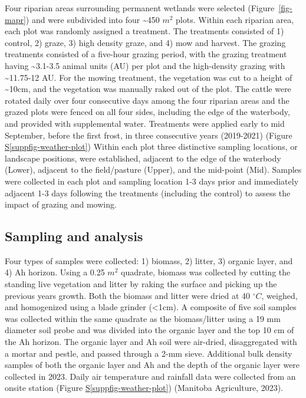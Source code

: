 \documentclass[
]{agujournal2019}
\newcommand*\quartosuppfigref[1]{Figure \hyperref[#1]{S\ref{#1}}}
\begin{document}
Four riparian areas surrounding permanent wetlands were selected
(Figure~\ref{fig-mapr}) and were subdivided into four \textasciitilde450
\(m^2\) plots. Within each riparian area, each plot was randomly
assigned a treatment. The treatments consisted of 1) control, 2) graze,
3) high density graze, and 4) mow and harvest. The grazing treatments
consisted of a five-hour grazing period, with the grazing treatment
having \textasciitilde3.1-3.5 animal units (AU) per plot and the
high-density grazing with \textasciitilde11.75-12 AU. For the mowing
treatment, the vegetation was cut to a height of \textasciitilde10cm,
and the vegetation was manually raked out of the plot. The cattle were
rotated daily over four consecutive days among the four riparian areas
and the grazed plots were fenced on all four sides, including the edge
of the waterbody, and provided with supplemental water. Treatments were
applied early to mid September, before the first frost, in three
consecutive years (2019-2021) (\quartosuppfigref{suppfig-weather-plot})
Within each plot three distinctive sampling locations, or landscape
positions, were established, adjacent to the edge of the waterbody
(Lower), adjacent to the field/pasture (Upper), and the mid-point (Mid).
Samples were collected in each plot and sampling location 1-3 days prior
and immediately adjacent 1-3 days following the treatments (including
the control) to assess the impact of grazing and mowing.

\subsection{Sampling and analysis}\label{sampling-and-analysis}

Four types of samples were collected: 1) biomass, 2) litter, 3) organic
layer, and 4) Ah horizon. Using a 0.25 \(m^2\) quadrate, biomass was
collected by cutting the standing live vegetation and litter by raking
the surface and picking up the previous years growth. Both the biomass
and litter were dried at 40 \(^\circ C\), weighed, and homogenized using
a blade grinder (\textless1cm). A composite of five soil samples was
collected within the same quadrate as the biomass/litter using a 19 mm
diameter soil probe and was divided into the organic layer and the top
10 cm of the Ah horizon. The organic layer and Ah soil were air-dried,
disaggregated with a mortar and pestle, and passed through a 2-mm sieve.
Additional bulk density samples of both the organic layer and Ah and the
depth of the organic layer were collected in 2023. Daily air temperature
and rainfall data were collected from an onsite station
(\quartosuppfigref{suppfig-weather-plot}) (Manitoba Agriculture, 2023).
\end{document}
